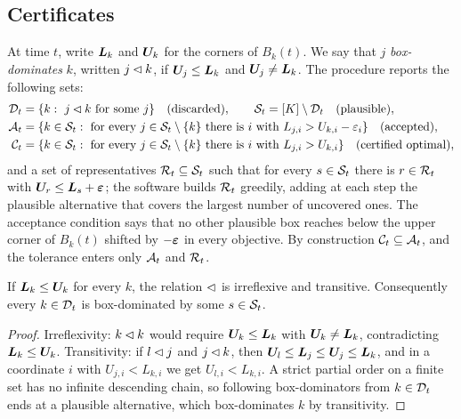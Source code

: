 \subsection{Certificates}\label{sec:certificates}

At time $t$, write $\bm{L}_k$ and $\bm{U}_k$ for the corners of $B_k(t)$. We say that $j$ \emph{box-dominates} $k$, written $j\lhd k$, if $\bm{U}_j\le\bm{L}_k$ and $\bm{U}_j\ne\bm{L}_k$. The procedure reports the following sets:
\begin{align*}
\mathcal{D}_t&=\{k:\ j\lhd k\text{ for some }j\}\quad\text{(discarded)},\qquad \mathcal{S}_t=[K]\setminus\mathcal{D}_t\quad\text{(plausible)},\\
\mathcal{A}_t&=\{k\in\mathcal{S}_t:\ \text{for every } j\in\mathcal{S}_t\setminus\{k\}\text{ there is } i \text{ with } L_{j,i}>U_{k,i}-\varepsilon_i\}\quad\text{(accepted)},\\
\mathcal{C}_t&=\{k\in\mathcal{S}_t:\ \text{for every } j\in\mathcal{S}_t\setminus\{k\}\text{ there is } i \text{ with } L_{j,i}>U_{k,i}\}\quad\text{(certified optimal)},
\end{align*}
and a set of representatives $\mathcal{R}_t\subseteq\mathcal{S}_t$ such that for every $s\in\mathcal{S}_t$ there is $r\in\mathcal{R}_t$ with $\bm{U}_r\le\bm{L}_s+\bm{\varepsilon}$; the software builds $\mathcal{R}_t$ greedily, adding at each step the plausible alternative that covers the largest number of uncovered ones. The acceptance condition says that no other plausible box reaches below the upper corner of $B_k(t)$ shifted by $-\bm{\varepsilon}$ in every objective. By construction $\mathcal{C}_t\subseteq\mathcal{A}_t$, and the tolerance enters only $\mathcal{A}_t$ and $\mathcal{R}_t$.

\begin{lemma}\label{lem:order}
If $\bm{L}_k\le\bm{U}_k$ for every $k$, the relation $\lhd$ is irreflexive and transitive. Consequently every $k\in\mathcal{D}_t$ is box-dominated by some $s\in\mathcal{S}_t$.
\end{lemma}

\begin{proof}
Irreflexivity: $k\lhd k$ would require $\bm{U}_k\le\bm{L}_k$ with $\bm{U}_k\ne\bm{L}_k$, contradicting $\bm{L}_k\le\bm{U}_k$. Transitivity: if $l\lhd j$ and $j\lhd k$, then $\bm{U}_l\le\bm{L}_j\le\bm{U}_j\le\bm{L}_k$, and in a coordinate $i$ with $U_{j,i}<L_{k,i}$ we get $U_{l,i}<L_{k,i}$. A strict partial order on a finite set has no infinite descending chain, so following box-dominators from $k\in\mathcal{D}_t$ ends at a plausible alternative, which box-dominates $k$ by transitivity.
\end{proof}

